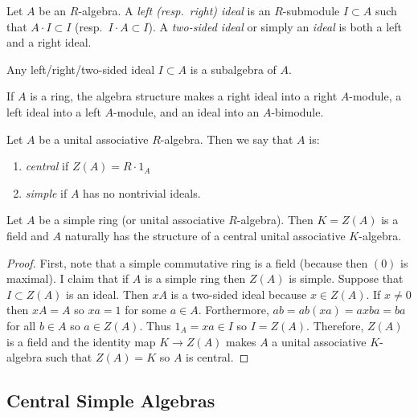 \documentclass[12pt]{extarticle}
\begin{document}
\begin{defn}
Let $A$ be an $R$-algebra. A \textit{left (resp.\ right) ideal} is an $R$-submodule $I \subset A$ such that $A \cdot I \subset I$ (resp.\ $I \cdot A \subset I$). A \textit{two-sided ideal} or simply an \textit{ideal} is both a left and a right ideal.
\end{defn}

\begin{rmk}
Any left/right/two-sided ideal $I \subset A$ is a subalgebra of $A$.
\end{rmk}

\begin{rmk}
If $A$ is a ring, the algebra structure makes a right ideal into a right $A$-module, a left ideal into a left $A$-module, and an ideal into an $A$-bimodule.
\end{rmk}

\begin{defn}
Let $A$ be a unital associative $R$-algebra. Then we say that $A$ is:
\begin{enumerate}
\item \textit{central} if $Z(A) = R \cdot 1_A$
\item \textit{simple} if $A$ has no nontrivial ideals.
\end{enumerate}
\end{defn}

\begin{prop}
Let $A$ be a simple ring (or unital associative $R$-algebra). Then $K = Z(A)$ is a field and $A$ naturally has the structure of a central unital associative $K$-algebra.
\end{prop}

\begin{proof}
First, note that a simple commutative ring is a field (because then $(0)$ is maximal). I claim that if $A$ is a simple ring then $Z(A)$ is simple. Suppose that $I \subset Z(A)$ is an ideal. Then $x A$ is a two-sided ideal because $x \in Z(A)$. If $x \neq 0$ then $x A = A$ so $x a = 1$ for some $a \in A$. Forthermore, $ab = ab (xa) = ax ba = ba$ for all $b \in A$ so $a \in Z(A)$. Thus $1_A = xa \in I$ so $I = Z(A)$. Therefore, $Z(A)$ is a field and the identity map $K \to Z(A)$ makes $A$ a unital associative $K$-algebra such that $Z(A) = K$ so $A$ is central. 
\end{proof}


\subsection{Central Simple Algebras}
\end{document}
